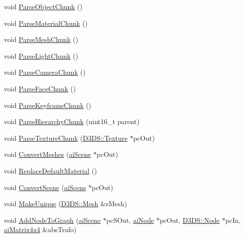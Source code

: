 \begin{DoxyCompactItemize}
\item 
void \hyperlink{class_assimp_1_1_discreet3_d_s_importer_aaa3cbae948bc9b29d2b9a9148cee56df}{Parse\+Object\+Chunk} ()
\item 
void \hyperlink{class_assimp_1_1_discreet3_d_s_importer_a76d66329668485c4b83267a6bf13107e}{Parse\+Material\+Chunk} ()
\item 
void \hyperlink{class_assimp_1_1_discreet3_d_s_importer_afe554f1673a9da4414338c0f728c4291}{Parse\+Mesh\+Chunk} ()
\item 
void \hyperlink{class_assimp_1_1_discreet3_d_s_importer_a115410365c7dd151f3eb09437622e8b8}{Parse\+Light\+Chunk} ()
\item 
void \hyperlink{class_assimp_1_1_discreet3_d_s_importer_a279e418f7750e3952af2d76a9efa4d08}{Parse\+Camera\+Chunk} ()
\item 
void \hyperlink{class_assimp_1_1_discreet3_d_s_importer_ac1e6397477c3199f10f6ec67bb02c219}{Parse\+Face\+Chunk} ()
\item 
void \hyperlink{class_assimp_1_1_discreet3_d_s_importer_a7557960504c1f4195c7111878d33b234}{Parse\+Keyframe\+Chunk} ()
\item 
void \hyperlink{class_assimp_1_1_discreet3_d_s_importer_a05fd11e49ea30b289cd176a4418ec33c}{Parse\+Hierarchy\+Chunk} (uint16\+\_\+t parent)
\item 
void \hyperlink{class_assimp_1_1_discreet3_d_s_importer_a89aa731f59d28efa84d9a1707320c824}{Parse\+Texture\+Chunk} (\hyperlink{struct_assimp_1_1_d3_d_s_1_1_texture}{D3\+D\+S\+::\+Texture} $\ast$pc\+Out)
\item 
void \hyperlink{class_assimp_1_1_discreet3_d_s_importer_a4636e5e4a38b955e11103810bc036cc1}{Convert\+Meshes} (\hyperlink{structai_scene}{ai\+Scene} $\ast$pc\+Out)
\item 
void \hyperlink{class_assimp_1_1_discreet3_d_s_importer_a4b18fe45096fd1809883e2d08c0e76ed}{Replace\+Default\+Material} ()
\item 
void \hyperlink{class_assimp_1_1_discreet3_d_s_importer_a7afd63dd6942c8197481f7aec1532b75}{Convert\+Scene} (\hyperlink{structai_scene}{ai\+Scene} $\ast$pc\+Out)
\item 
void \hyperlink{class_assimp_1_1_discreet3_d_s_importer_afde9f0ae8192c5eb1a6a321fa574619d}{Make\+Unique} (\hyperlink{struct_assimp_1_1_d3_d_s_1_1_mesh}{D3\+D\+S\+::\+Mesh} \&s\+Mesh)
\item 
void \hyperlink{class_assimp_1_1_discreet3_d_s_importer_affbbaa2cc037c8912012e849afea56bf}{Add\+Node\+To\+Graph} (\hyperlink{structai_scene}{ai\+Scene} $\ast$pc\+S\+Out, \hyperlink{structai_node}{ai\+Node} $\ast$pc\+Out, \hyperlink{struct_assimp_1_1_d3_d_s_1_1_node}{D3\+D\+S\+::\+Node} $\ast$pc\+In, \hyperlink{structai_matrix4x4}{ai\+Matrix4x4} \&abs\+Trafo)

\end{DoxyCompactItemize}
